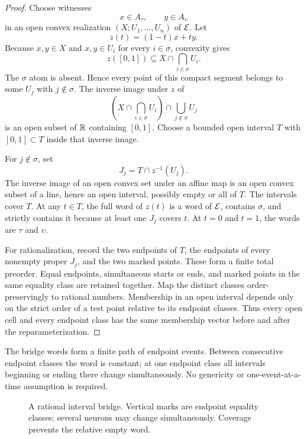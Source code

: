 \begin{proof}
Choose witnesses
\[
 x\in A_\tau,
 \qquad
 y\in A_\upsilon
\]
in an open convex realization $(X;U_1,\ldots,U_n)$ of $\mathcal E$.  Let
\[
 z(t)=(1-t)x+ty.
\]
Because $x,y\in X$ and $x,y\in U_i$ for every $i\in\sigma$, convexity gives
\[
 z([0,1])\subseteq X\cap\bigcap_{i\in\sigma}U_i.
\]
The $\sigma$ atom is absent.  Hence every point of this compact segment belongs to some $U_j$ with $j\notin\sigma$.  The inverse image under $z$ of
\[
 \left(X\cap\bigcap_{i\in\sigma}U_i\right)
 \cap\bigcup_{j\notin\sigma}U_j
\]
is an open subset of $\mathbb R$ containing $[0,1]$.  Choose a bounded open interval $T$ with $[0,1]\subset T$ inside that inverse image.

For $j\notin\sigma$, set
\[
 J_j=T\cap z^{-1}(U_j).
\]
The inverse image of an open convex set under an affine map is an open convex subset of a line, hence an open interval, possibly empty or all of $T$.  The intervals cover $T$.  At any $t\in T$, the full word of $z(t)$ is a word of $\mathcal E$, contains $\sigma$, and strictly contains it because at least one $J_j$ covers $t$.  At $t=0$ and $t=1$, the words are $\tau$ and $\upsilon$.

For rationalization, record the two endpoints of $T$, the endpoints of every nonempty proper $J_j$, and the two marked points.  These form a finite total preorder.  Equal endpoints, simultaneous starts or ends, and marked points in the same equality class are retained together.  Map the distinct classes order-preservingly to rational numbers.  Membership in an open interval depends only on the strict order of a test point relative to its endpoint classes.  Thus every open cell and every endpoint class has the same membership vector before and after the reparameterization.
\end{proof}

\begin{corollary}
The bridge words form a finite path of endpoint events.  Between consecutive endpoint classes the word is constant; at one endpoint class all intervals beginning or ending there change simultaneously.  No genericity or one-event-at-a-time assumption is required.
\end{corollary}

\begin{figure}[t]
\centering

\caption{A rational interval bridge.  Vertical marks are endpoint equality classes; several neurons may change simultaneously.  Coverage prevents the relative empty word.}
\label{fig:rational-bridge}
\end{figure}

